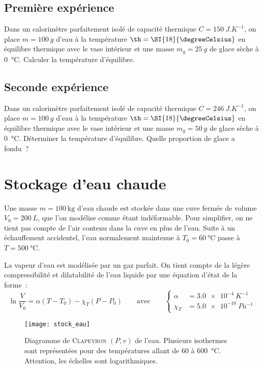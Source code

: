 \documentclass[a4paper, 10pt, final, garamond]{book}
\begin{document}
\begin{multicols}{2}
	\subsection{Première expérience}
	Dans un calorimètre parfaitement isolé de capacité thermique $C =
		\SI{150}{J.K^{-1}}$, on place $m = \SI{100}{g}$ d'eau à la température $\th
		= \SI{18}{\degreeCelsius}$ en équilibre thermique avec le vase intérieur et
	une masse $m_g = \SI{25}{g}$ de glace sèche à \SI{0}{\degreeCelsius}. Calculer
	la température d'équilibre.

	\subsection{Seconde expérience}
	Dans un calorimètre parfaitement isolé de capacité thermique $C =
		\SI{246}{J.K^{-1}}$, on place $m = \SI{100}{g}$ d'eau à la température $\th
		= \SI{18}{\degreeCelsius}$ en équilibre thermique avec le vase intérieur et
	une masse $m_g = \SI{50}{g}$ de glace sèche à \SI{0}{\degreeCelsius}.
	Déterminer la température d'équilibre. Quelle proportion de glace a fondu~?
\end{multicols}

\section{Stockage d'eau chaude}
Une masse $m = \SI{100}{\kilo\gram}$ d'eau chaude est stockée dans une cuve
fermée de volume $V_0 = \SI{200}{L}$, que l'on modélise comme étant
indéformable. Pour simplifier, on ne tient pas compte de l'air contenu dans la
cuve en plus de l'eau. Suite à un échauffement accidentel, l'eau normalement
maintenue à $T_0 = \SI{60}{\degreeCelsius}$ passe à $T =
	\SI{500}{\degreeCelsius}$.

La vapeur d'eau est modélisée par un gaz parfait. On tient compte de la légère
compressibilité et dilatabilité de l'eau liquide par une équation d'état de la
forme~:
\[
	\ln \frac{V}{V_0}=\alpha (T-T_0)-\chi_T(P-P_0)
	\qquad \text{avec} \qquad
	\left\{
	\begin{aligned}
		\alpha & = \SI{3.0e-4}{K^{-1}}   \\
		\chi_T & = \SI{5.0e-10}{Pa^{-1}}
	\end{aligned}
	\right.
\]

\begin{figure}[h!]
	\centering
	\texttt{[image: stock\_eau]}
	\caption{Diagramme de \textsc{Clapeyron} $(P,v)$ de l'eau. Plusieurs
		isothermes sont représentées pour des températures allant de 60 à
		\SI{600}{\degreeCelsius}. Attention, les échelles sont logarithmiques.
	}
	\label{fig:stock_eau}
\end{figure}
\end{document}
